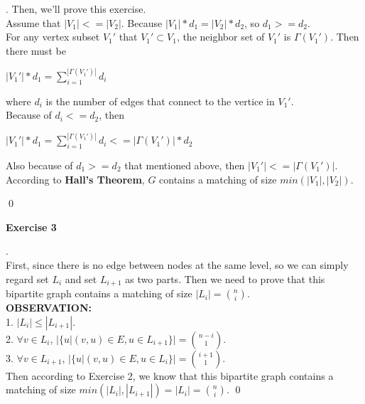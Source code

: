 \documentclass[12pt, notitlepage]{article}
\newenvironment{sol}
  {\par\vspace{3mm}\noindent{\it Solution}.}{\qed}
\begin{document}
\begin{sol}
Then, we'll prove this exercise.\\
Assume that $|V_1| <= |V_2|$. Because $|V_1|*d_1 = |V_2|*d_2$, so $d_1 >= d_2$.\\
For any vertex subset $V_1'$ that $V_1'\subset V_1$, the neighbor set of $V_1'$ is $\Gamma (V_1')$. Then there must be
\centerline{$|V_1'|*d_1 = \sum\limits^{|\Gamma (V_1')|}_{i=1}d_i$}
where $d_i$ is the number of edges that connect to the vertice in $V_1'$.\\
Because of $d_i <= d_2$, then\\
\centerline{$|V_1'|*d_1 = \sum\limits^{|\Gamma (V_1')|}_{i=1}d_i <= |\Gamma (V_1')| * d_2$}
Also because of $d_1 >= d_2$ that mentioned above, then $|V_1'| <= |\Gamma (V_1')|$.\\
According to \textbf{Hall's Theorem},  $G$ contains a matching of size $min(|V_1|, |V_2|)$.

\end{sol}


\textbf{Exercise 3}
\begin{sol}\\
First, since there is no edge between nodes at the same level, so we can simply regard set $L_i$ and set $L_{i+1}$ as two parts. Then we need to prove that this bipartite graph contains a matching of size $|L_i|=\binom{n}{i}$.\\
\textbf{OBSERVATION:}\\
1. $|L_i|\leq |L_{i+1}|$.\\
2. $\forall v\in L_i$, $|\{u|(v,u)\in E, u\in L_{i+1}\}|=\binom{n-i}{1}$.\\
3. $\forall v\in L_{i+1}$, $|\{u|(v,u)\in E, u\in L_i\}|=\binom{i+1}{1}$.\\
Then according to Exercise 2, we know that this bipartite graph contains a matching of size $min(|L_i|,|L_{i+1}|)=|L_i|=\binom{n}{i}$.
\end{sol}\\
\end{document}
